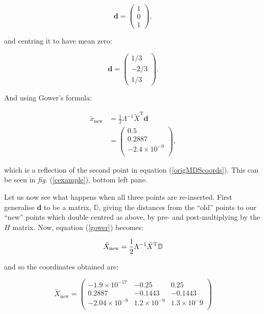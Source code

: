 \documentclass[a4paper,10pt]{article}
\newcommand{\fig}[1]{\emph{fig.} (\ref{#1})}
\newcommand{\tr}[1]{#1^{\text{T}}}
\newcommand{\cross}{\times}
\begin{document}
\begin{equation*}
\mathbf{d}=\begin{pmatrix} 
	1\\
	0\\ 
	1
	\end{pmatrix},
\end{equation*}

and centring it to have mean zero:

\begin{equation*}
\mathbf{d}=\begin{pmatrix} 
	1/3\\
	-2/3\\ 
	1/3
	\end{pmatrix}.
\end{equation*}

And using Gower's formula:

\begin{equation*}
\begin{aligned}
\tilde{x}_{\text{new}} &= \frac{1}{2} \Lambda^{-1} \tr{\tilde{X}} \mathbf{d}\\
&=\begin{pmatrix}
0.5\\
0.2887\\
-2.4 \cross 10^{-9}\\
\end{pmatrix},
\end{aligned}
\end{equation*}

which is a reflection of the second point in equation (\ref{origMDScoords}). This can be seen in \fig{cexample}, bottom left pane.

Let us now see what happens when all three points are re-inserted. First generalise $\mathbf{d}$ to be a matrix, $\mathbb{D}$, giving the distances from the ``old'' points to our ``new'' points which double centred as above, by pre- and post-multiplying by the $H$ matrix. Now, equation (\ref{gower}) becomes:

\begin{equation*}
\tilde{X}_{\text{new}} = \frac{1}{2} \Lambda^{-1} \tr{\tilde{X}} \mathbb{D}\\
\end{equation*}

and so the coordinates obtained are:

\begin{equation*}
\tilde{X}_\text{new}=\begin{pmatrix}
-1.9\cross 10^{-17} & -0.25 & 0.25\\
 0.2887 & -0.1443 & -0.1443\\
-2.04\cross 10^{-9} &  1.2\cross 10^{-9} & 1.3\cross 10^-{9}\\
\end{pmatrix}
\end{equation*}
\end{document}
